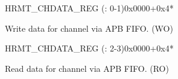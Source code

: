 \begin{register}{H}{RMT\_CHDATA\_REG (: 0-1)}{0x0000+0x4*}\label{regdesc:RMTCHNDATAREG}
%
\regnewline%
\begin{regdesc}\begin{reglist}
\label{fielddesc:RMTCHNDATA}\item [RMT\_CH\regindex{n}DATA] Write data for channel  via APB FIFO. (WO)
\end{reglist}\end{regdesc}
\end{register}


\begin{register}{H}{RMT\_CHDATA\_REG (: 2-3)}{0x0000+0x4*}\label{regdesc:RMTCHMDATAREG}
%
\regnewline%
\begin{regdesc}\begin{reglist}
\label{fielddesc:RMTCHMDATA}\item [RMT\_CH\regindex{m}DATA] Read data for channel  via APB FIFO. (RO)
\end{reglist}\end{regdesc}
\end{register}


